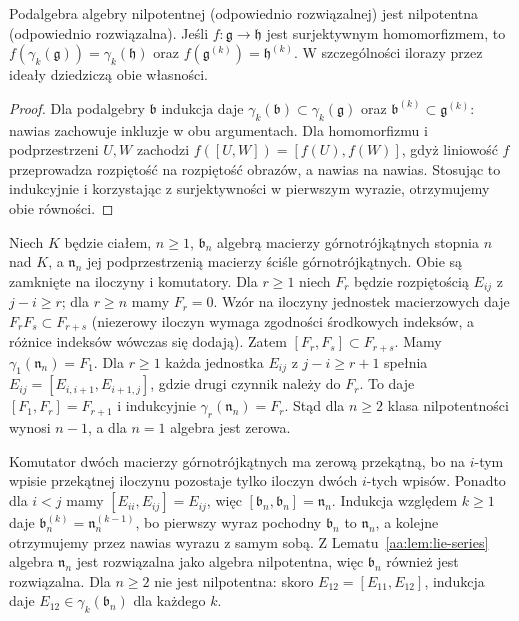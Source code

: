\begin{stwierdzenie}
\label{aa:prop:lie-series-images}
Podalgebra algebry nilpotentnej (odpowiednio rozwiązalnej)
jest nilpotentna (odpowiednio rozwiązalna).
Jeśli $f:\mathfrak g\to\mathfrak h$ jest surjektywnym
homomorfizmem, to $f(\gamma_k(\mathfrak g))=
\gamma_k(\mathfrak h)$ oraz $f(\mathfrak g^{(k)})=
\mathfrak h^{(k)}$. W szczególności ilorazy przez
ideały dziedziczą obie własności.
\end{stwierdzenie}
\begin{proof}
Dla podalgebry $\mathfrak b$ indukcja daje
$\gamma_k(\mathfrak b)\subset\gamma_k(\mathfrak g)$
oraz $\mathfrak b^{(k)}\subset\mathfrak g^{(k)}$:
nawias zachowuje inkluzje w obu argumentach.
Dla homomorfizmu i podprzestrzeni $U,W$ zachodzi
$f([U,W])=[f(U),f(W)]$, gdyż liniowość $f$
przeprowadza rozpiętość na rozpiętość obrazów,
a nawias na nawias. Stosując to indukcyjnie
i korzystając z surjektywności w pierwszym wyrazie,
otrzymujemy obie równości.
\end{proof}

\begin{przyklad}
\label{aa:prz:triangular-lie}
Niech $K$ będzie ciałem, $n\ge1$, $\mathfrak b_n$
algebrą macierzy górnotrójkątnych stopnia $n$ nad $K$,
a $\mathfrak n_n$
jej podprzestrzenią macierzy ściśle górnotrójkątnych.
Obie są zamknięte na iloczyny i komutatory.
Dla $r\ge1$ niech $F_r$ będzie rozpiętością
$E_{ij}$ z $j-i\ge r$; dla $r\ge n$ mamy $F_r=0$.
Wzór na iloczyny jednostek macierzowych daje
$F_rF_s\subset F_{r+s}$ (niezerowy iloczyn wymaga
zgodności środkowych indeksów, a różnice indeksów
wówczas się dodają). Zatem $[F_r,F_s]\subset F_{r+s}$.
Mamy $\gamma_1(\mathfrak n_n)=F_1$. Dla $r\ge1$
każda jednostka $E_{ij}$ z $j-i\ge r+1$ spełnia
$E_{ij}=[E_{i,i+1},E_{i+1,j}]$, gdzie drugi
czynnik należy do $F_r$. To daje
$[F_1,F_r]=F_{r+1}$ i indukcyjnie
$\gamma_r(\mathfrak n_n)=F_r$. Stąd dla $n\ge2$
klasa nilpotentności wynosi $n-1$, a dla $n=1$
algebra jest zerowa.

Komutator dwóch macierzy górnotrójkątnych ma zerową
przekątną, bo na $i$-tym wpisie przekątnej iloczynu
pozostaje tylko iloczyn dwóch $i$-tych wpisów.
Ponadto dla $i<j$ mamy $[E_{ii},E_{ij}]=E_{ij}$,
więc $[\mathfrak b_n,\mathfrak b_n]=\mathfrak n_n$.
Indukcja względem $k\ge1$ daje
$\mathfrak b_n^{(k)}=\mathfrak n_n^{(k-1)}$,
bo pierwszy wyraz pochodny $\mathfrak b_n$ to
$\mathfrak n_n$, a kolejne otrzymujemy przez
nawias wyrazu z samym sobą. Z
Lematu~\ref{aa:lem:lie-series} algebra $\mathfrak n_n$
jest rozwiązalna jako algebra nilpotentna,
więc $\mathfrak b_n$ również jest rozwiązalna.
Dla $n\ge2$ nie jest nilpotentna: skoro
$E_{12}=[E_{11},E_{12}]$, indukcja daje
$E_{12}\in\gamma_k(\mathfrak b_n)$ dla każdego $k$.
\end{przyklad}


